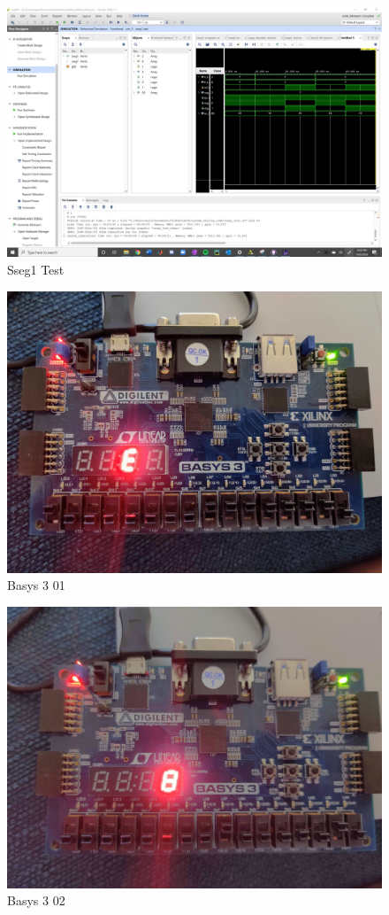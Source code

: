 \documentclass[11pt]{article}
\begin{document}
\begin{figure}[ht]
	\includegraphics[width=1\textwidth,trim=19cm 14cm 0cm 6cm,clip]{sseg1_test_screen}
	\caption{Sseg1 Test}
	\label{fig:sse1g_scrn}
\end{figure}

\begin{figure}[ht]\centering
	\includegraphics[width=.5\textwidth]{basys3_lab06_1}
	\caption{Basys 3 01}
	\label{fig:b3_0}			
\end{figure}

\begin{figure}[ht]\centering
	\includegraphics[width=.5\textwidth]{basys3_lab06_0}
	\caption{Basys 3 02}
	\label{fig:b3_1}			
\end{figure}
\end{document}
